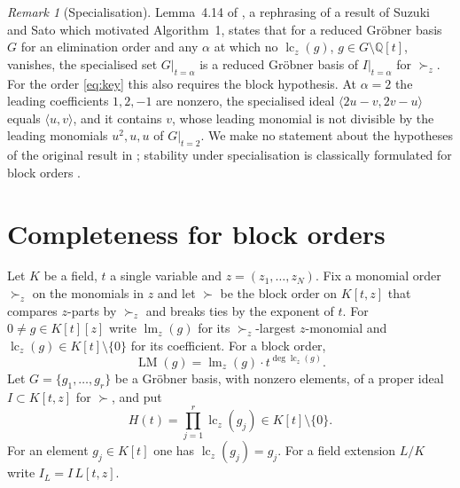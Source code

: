 \documentclass[11pt,a4paper]{article}
\theoremstyle{plain}
\theoremstyle{definition}
\theoremstyle{remark}
\newtheorem{remark}[theorem]{Remark}
\newcommand{\Q}{\mathbb{Q}}
\newcommand{\lc}{\operatorname{lc}}
\newcommand{\lmz}{\operatorname{lm}}
\newcommand{\LM}{\operatorname{LM}}
\begin{document}
\begin{remark}[Specialisation]\label{rem:specialisation}
Lemma~4.14 of \cite{acr}, a rephrasing of a result of Suzuki and Sato \cite{suzuki} which motivated Algorithm~1, states that for a reduced Gr\"obner basis $G$ for an elimination order and any $\alpha$ at which no $\lc_z(g)$, $g\in G\setminus\Q[t]$, vanishes, the specialised set $G|_{t=\alpha}$ is a reduced Gr\"obner basis of $I|_{t=\alpha}$ for $\succ_z$. For the order \eqref{eq:key} this also requires the block hypothesis. At $\alpha=2$ the leading coefficients $1,2,-1$ are nonzero, the specialised ideal $\langle 2u-v,2v-u\rangle$ equals $\langle u,v\rangle$, and it contains $v$, whose leading monomial is not divisible by the leading monomials $u^2,u,u$ of $G|_{t=2}$. We make no statement about the hypotheses of the original result in \cite{suzuki}; stability under specialisation is classically formulated for block orders \cite{kalkbrener,montes}.
\end{remark}

\section{Completeness for block orders}\label{sec:block}

Let $K$ be a field, $t$ a single variable and $z=(z_1,\dots,z_N)$. Fix a monomial order $\succ_z$ on the monomials in $z$ and let $\succ$ be the block order on $K[t,z]$ that compares $z$-parts by $\succ_z$ and breaks ties by the exponent of $t$. For $0\neq g\in K[t][z]$ write $\lmz_z(g)$ for its $\succ_z$-largest $z$-monomial and $\lc_z(g)\in K[t]\setminus\{0\}$ for its coefficient. For a block order,
\begin{equation}\label{eq:blockprop}
  \LM(g)=\lmz_z(g)\cdot t^{\deg\lc_z(g)} .
\end{equation}
Let $G=\{g_1,\dots,g_r\}$ be a Gr\"obner basis, with nonzero elements, of a proper ideal $I\subset K[t,z]$ for $\succ$, and put
\[
  H(t)=\prod_{j=1}^r\lc_z(g_j)\in K[t]\setminus\{0\}.
\]
For an element $g_j\in K[t]$ one has $\lc_z(g_j)=g_j$. For a field extension $L/K$ write $I_L=I\,L[t,z]$.
\end{document}
